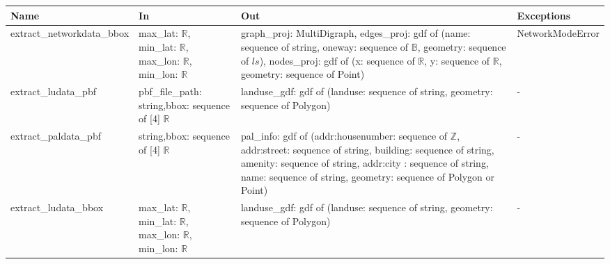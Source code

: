 \documentclass[12pt, titlepage]{article}
\begin{document}
\begin{center}
\begin{tabular}{| >{\raggedright}p{5cm} | >{\raggedright}p{4cm} | >{\raggedright}p{4cm} | l |}
\hline
\textbf{Name} & \textbf{In} & \textbf{Out} & \textbf{Exceptions} \\
\hline
extract\_networkdata\_bbox & max\_lat: $\mathbb{R}$, \newline min\_lat: $\mathbb{R}$, \newline max\_lon: $\mathbb{R}$, \newline min\_lon: $\mathbb{R}$ & graph\_proj: MultiDigraph, \newline edges\_proj: gdf of (name: sequence of string, \newline oneway: sequence of $\mathbb{B}$, geometry: sequence of $ls$), \newline nodes\_proj: gdf of (x: sequence of $\mathbb{R}$, \newline y: sequence of $\mathbb{R}$, geometry: sequence of Point) & NetworkModeError\\
\hline
extract\_ludata\_pbf & pbf\_file\_path: string,\newline bbox: sequence of [4] $\mathbb{R}$ & landuse\_gdf: gdf of (landuse: sequence of string, \newline geometry: sequence of Polygon) & -\\
\hline
extract\_paldata\_pbf & string,\newline bbox: sequence of [4] $\mathbb{R}$ & pal\_info: gdf of (addr:housenumber: sequence of $\mathbb{Z}$, \newline addr:street: sequence of string, \newline building: sequence of string, \newline amenity: sequence of string, \newline addr:city : sequence of string, \newline name: sequence of string, \newline geometry: sequence of Polygon or Point) & -\\
\hline
extract\_ludata\_bbox & max\_lat: $\mathbb{R}$, \newline min\_lat: $\mathbb{R}$, \newline max\_lon: $\mathbb{R}$, \newline min\_lon: $\mathbb{R}$ & landuse\_gdf: gdf of (landuse: sequence of string, \newline geometry: sequence of Polygon) & -\\
\hline

\end{tabular}


\end{center}
\end{document}
